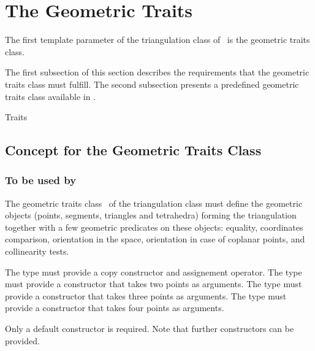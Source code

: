 \section{The Geometric Traits}
\label{Triangulation3-sec-Traits}

The first template parameter of the triangulation class
 of \cgal\ is the geometric traits class.

The first subsection of this section describes the requirements
that the geometric traits class must fulfill. The second subsection
presents a predefined geometric traits class available in \cgal.

	
	\begin{ccClass}{Traits}
	\subsection{Concept for the Geometric Traits Class 
	\protect \ccClassName}
	\label{Triangulation3-sec-concept-Traits}

\subsubsection{To be used by \protect {}}


The geometric traits class \ccClassName\ of the triangulation
class  must define the geometric
objects (points, segments, triangles and tetrahedra) forming the
triangulation together with a few geometric predicates on these objects:
equality, coordinates comparison, orientation in the space, orientation
in case of coplanar points, and collinearity tests.

\ccTypes
{}

{The type must provide a copy constructor and assignement operator.}
\ccGlue
{}
{The  type must provide a constructor that takes two points as arguments.}
\ccGlue
{}
{The type must provide a constructor that takes three points as
arguments.}
\ccGlue
{}
{The type must provide a constructor that takes four points as
arguments.}

\ccCreation
{}

Only a default constructor is required. Note that further constructors
can be provided. 


\end{ccClass}
